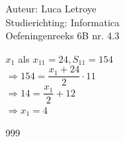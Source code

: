 \documentclass[a4paper]{article}
\begin{document}
  
\noindent \large Auteur: Luca Letroye \\
\noindent \large Studierichting: Informatica\\
\noindent \large Oefeningenreeks 6B nr. 4.3\\

\medskip
\normalsize

$x_1$ als $x_{11} = 24, S_{11} = 154$\\

$\Rightarrow 154 = \dfrac{x_1 + 24}{2}\cdot 11$\\

$\Rightarrow 14 = \dfrac{x_1}{2}+12$\\

$\Rightarrow x_1 = 4$\\


\begin{thebibliography}{999}
\end{thebibliography}
\end{document}
